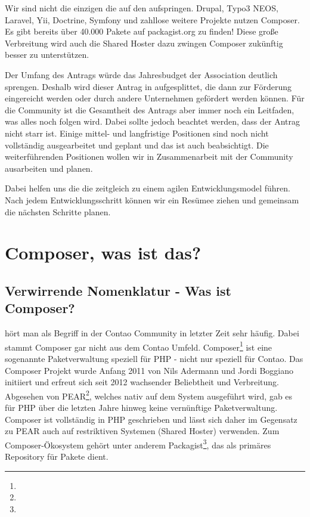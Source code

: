 \documentclass[
paper=a4,
draft=false,%
fontsize=10pt%
]{scrartcl}
\begin{document}
Wir sind nicht die einzigen die auf den  aufspringen. Drupal, Typo3 NEOS, Laravel, Yii, Doctrine, Symfony und zahllose weitere Projekte nutzen Composer. Es gibt bereits über 40.000 Pakete auf packagist.org zu finden! Diese große Verbreitung wird auch die Shared Hoster dazu zwingen Composer zukünftig besser zu unterstützen.

Der Umfang des Antrags würde das Jahresbudget der Association deutlich sprengen. Deshalb wird dieser Antrag in  aufgesplittet, die dann zur Förderung eingereicht werden oder durch andere Unternehmen gefördert werden können.
Für die Community ist die Gesamtheit des Antrags aber immer noch ein Leitfaden, was alles noch folgen wird.
Dabei sollte jedoch beachtet werden, dass der Antrag nicht starr ist. Einige mittel- und langfristige Positionen sind noch nicht vollständig ausgearbeitet und geplant und das ist auch beabsichtigt. Die weiterführenden Positionen wollen wir in Zusammenarbeit mit der Community ausarbeiten und planen.

Dabei helfen uns die  die zeitgleich zu einem agilen Entwicklungsmodel führen. Nach jedem Entwicklungsschritt können wir ein Resümee ziehen und gemeinsam die nächsten Schritte planen.

\newpage

%
%

\section{Composer, was ist das?}
\label{sec:why-composer}

\subsection{Verwirrende Nomenklatur - Was ist Composer?}

 hört man als Begriff in der Contao Community in letzter Zeit sehr häufig. Dabei stammt Composer gar nicht aus dem Contao Umfeld. Composer\footnote{} ist eine sogenannte Paketverwaltung speziell für PHP - nicht nur speziell für Contao. Das Composer Projekt wurde Anfang 2011 von Nils Adermann und Jordi Boggiano initiiert und erfreut sich seit 2012 wachsender Beliebtheit und Verbreitung. Abgesehen von PEAR\footnote{}, welches nativ auf dem System ausgeführt wird, gab es für PHP über die letzten Jahre hinweg keine vernünftige Paketverwaltung. Composer ist vollständig in PHP geschrieben und lässt sich daher im Gegensatz zu PEAR auch auf restriktiven Systemen (Shared Hoster) verwenden. Zum Composer-Ökosystem gehört unter anderem Packagist\footnote{}, das als primäres Repository für Pakete dient.
\end{document}
